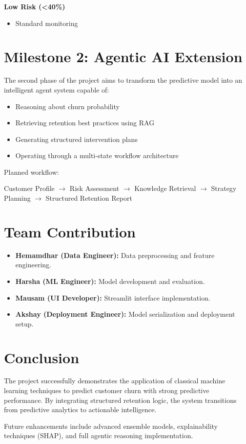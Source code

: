 \documentclass[12pt,a4paper]{article}
\begin{document}
\textbf{Low Risk (<40\%)}
\begin{itemize}
    \item Standard monitoring
\end{itemize}


\section{Milestone 2: Agentic AI Extension}

The second phase of the project aims to transform the predictive model into an intelligent agent system capable of:

\begin{itemize}
    \item Reasoning about churn probability
    \item Retrieving retention best practices using RAG
    \item Generating structured intervention plans
    \item Operating through a multi-state workflow architecture
\end{itemize}

Planned workflow:

\begin{center}
Customer Profile $\rightarrow$ Risk Assessment $\rightarrow$ Knowledge Retrieval $\rightarrow$ Strategy Planning $\rightarrow$ Structured Retention Report
\end{center}


\section{Team Contribution}

\begin{itemize}
    \item \textbf{Hemamdhar (Data Engineer):} Data preprocessing and feature engineering.
    \item \textbf{Harsha (ML Engineer):} Model development and evaluation.
    \item \textbf{Mausam (UI Developer):} Streamlit interface implementation.
    \item \textbf{Akshay (Deployment Engineer):} Model serialization and deployment setup.
\end{itemize}


\section{Conclusion}

The project successfully demonstrates the application of classical machine learning techniques to predict customer churn with strong predictive performance. By integrating structured retention logic, the system transitions from predictive analytics to actionable intelligence.

Future enhancements include advanced ensemble models, explainability techniques (SHAP), and full agentic reasoning implementation.
\end{document}

